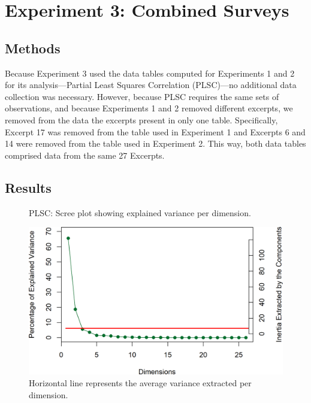 \documentclass[
  english,
  man,floatsintext]{apa6}
\begin{document}
\hypertarget{experiment-3-combined-surveys}{%
\section{Experiment 3: Combined Surveys}\label{experiment-3-combined-surveys}}

\hypertarget{methods-2}{%
\subsection{Methods}\label{methods-2}}

Because Experiment 3 used the data tables computed for Experiments 1 and 2 for its analysis---Partial Least Squares Correlation (PLSC)---no additional data collection was necessary. However, because PLSC requires the same sets of observations, and because Experiments 1 and 2 removed different excerpts, we removed from the data the excerpts present in only one table. Specifically, Excerpt 17 was removed from the table used in Experiment 1 and Excerpts 6 and 14 were removed from the table used in Experiment 2. This way, both data tables comprised data from the same 27 Excerpts.

\hypertarget{results-2}{%
\subsection{Results}\label{results-2}}

\begin{figure}  
  \begin{center}
  \caption{PLSC: Scree plot showing explained variance per dimension.}
    \includegraphics{./Music-Descriptor-Space_files/figure-latex/screePLSCcode-1.png}
  \caption*{Horizontal line represents the average variance extracted per dimension.}\label{fig:screePLSC}  
 \end{center}
\end{figure}
\end{document}
